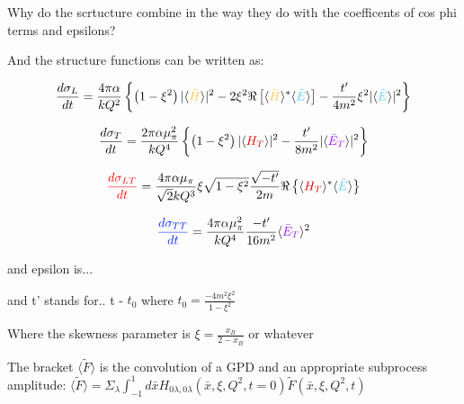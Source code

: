     
    Why do the scrtucture combine in the way they do with the coefficents of cos phi terms and epsilons?
    
    And the structure functions can be written as:

    \begin{equation}
         \textcolor{sigmaL}{\frac{d\sigma_{L}}{dt}} = 
        \frac{4\pi\alpha}{kQ^2}\left\{ \left( 1 - \xi^2 \right) 
        \lvert \langle \GPDHtildeEQ \rangle \rvert ^2 
        -2\xi^2 \Re \left[  \langle \GPDHtildeEQ \rangle ^* \langle \GPDEtildeEQ \rangle    \right] - \frac{t'}{4m^2}\xi^2
        \lvert \langle \GPDEtildeEQ \rangle \rvert ^2  \right\}
    \end{equation} 

    \begin{equation}
        \textcolor{sigmaT}{\frac{d\sigma_{T}}{dt}} = 
        \frac{2\pi\alpha \mu_{\pi}^2}{kQ^4}
        \left\{ \left( 1 - \xi^2 \right) 
        \lvert \langle \GPDHTEQ \rangle \rvert ^2
        - \frac{t'}{8m^2}
        \lvert \langle \GPDETbarEQ \rangle \rvert ^2  \right\}    
    \end{equation} 
    
    \begin{equation}
        \textcolor{sigmaLT}{\frac{d\sigma_{LT}}{dt}} = 
        \frac{4\pi\alpha \mu_{\pi}}{\sqrt{2}kQ^3}
        \xi\sqrt{1-\xi^2}
        \frac{\sqrt{-t'}}{2m}
        \Re \left\{ 
         \langle \GPDHTEQ \rangle ^*
        \langle \GPDEtildeEQ \rangle   
        \right\}
     \end{equation} 
    
    
    \begin{equation}
        \textcolor{sigmaTT}{\frac{d\sigma_{TT}}{dt}} = 
        \frac{4\pi\alpha \mu_{\pi}^2}{kQ^4}
        \frac{-t'}{16m^2}
        \langle \GPDETbarEQ \rangle^2   
    \end{equation} 
        
    

    and epsilon is... 
    
    and t' stands for.. t - $t_0$ where $t_0 = \frac{-4m^2\xi^2}{1-\xi^2}$
    
    
    Where the skewness parameter is $\xi = \frac{x_B}{2-x_B}$ or whatever
    

    The bracket $\langle \tilde{F} \rangle$ is the convolution of a GPD and an appropriate subprocess amplitude:
    $
    \langle \tilde{F} \rangle =  \Sigma_{\lambda} \int_{-1}^{1} d\bar{x}H_{0\lambda,0\lambda}\left( \bar{x}, \xi, Q^2, t=0  \right)\tilde{F}\left( \bar{x}, \xi, Q^2, t  \right)\   
    $ 


